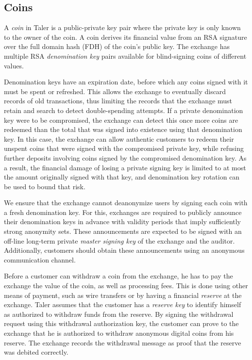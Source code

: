 \documentclass[sigconf, authordraft]{acmart}
\begin{document}
\subsection{Coins}

A \emph{coin} in Taler is a public-private key pair where the private
key is only known to the owner of the coin.  A coin derives its
financial value from an RSA signature over the full domain hash (FDH)
of the coin's public key. The exchange has multiple RSA
{\em denomination key} pairs available for blind-signing coins of
different values.

Denomination keys have an expiration date, before which any coins
signed with it must be spent or refreshed.  This allows the exchange
to eventually discard records of old transactions, thus limiting the
records that the exchange must retain and search to detect
double-spending attempts.  If a private denomination key were to be
compromised, the exchange can detect this once more coins are redeemed
than the total that was signed into existence using that denomination
key.  In this case, the exchange can allow authentic customers to
redeem their unspent coins that were signed with the compromised
private key, while refusing further deposits involving coins signed by
the compromised denomination key.  As a result, the financial damage
of losing a private signing key is limited to at most the amount
originally signed with that key, and denomination key rotation can be
used to bound that risk.

We ensure that the exchange cannot deanonymize users by signing
each coin with a fresh denomination key.  For this, exchanges are
required to publicly announce their denomination keys in advance
with validity periods that imply sufficiently strong anonymity sets.
These announcements are expected to be signed with an off-line
long-term private {\em master signing key} of the exchange and the
auditor.  Additionally, customers should obtain these announcements
using an anonymous communication channel.

Before a customer can withdraw a coin from the exchange, he has to pay
the exchange the value of the coin, as well as processing fees.  This
is done using other means of payment, such as wire transfers or by
having a financial {\em reserve} at the exchange.  Taler assumes that
the customer has a {\em reserve key} to identify
himself as authorized to withdraw funds from the reserve.  By signing
the withdrawal request using this withdrawal authorization key, the
customer can prove to the exchange that he is authorized to withdraw
anonymous digital coins from his reserve.  The exchange records the
withdrawal message as proof that the reserve was debited correctly.
\end{document}
